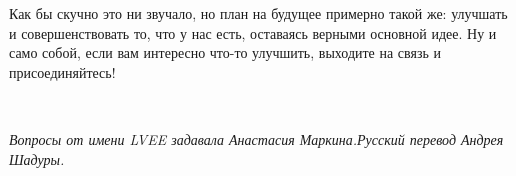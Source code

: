 \documentclass[10pt, a5paper]{article}
\begin{document}
\begin{Parallel}[p]{}{}
{Как бы скучно это ни звучало, но план на будущее примерно такой же: улучшать и совершенствовать то, что у нас есть, оставаясь верными основной идее. Ну и само собой, если вам интересно что-то улучшить, выходите на связь и присоединяйтесь!

~

\noindent \emph{Вопросы от имени LVEE задавала Анастасия Маркина.\linebreak Русский перевод Андрея Шадуры.}

\vfill
     }
   \end{Parallel}
\end{document}
